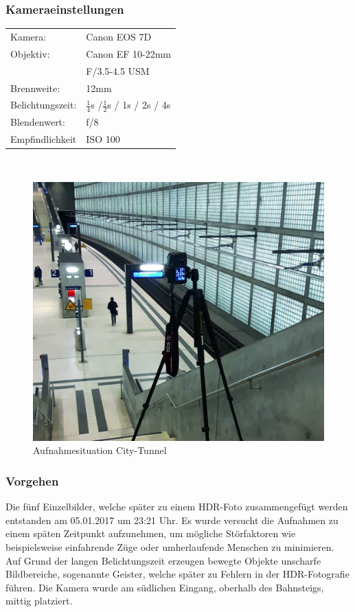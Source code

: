 \documentclass[liststotoc,bibtotoc,fontsize=14pt,]{scrreprt}
\begin{document}
	\subsubsection{Kameraeinstellungen}
	\begin{minipage}{0.58\textwidth}
		\begin{tabular}{ll}
			Kamera: &Canon EOS 7D \\
			Objektiv: &Canon EF 10-22mm \\
			& F/3.5-4.5 USM\\		
			Brennweite:& 12mm \\
			Belichtungszeit: & $\frac{1}{4}$s /$\frac{1}{2}$s / 1s / 2s / 4s\\
			Blendenwert: & f/8\\
			Empfindlichkeit & ISO 100 \\
		\end{tabular}\\
	\end{minipage}%
	\begin{minipage}{0.42\textwidth}
		\begin{figure}[H]
			\includegraphics[width=\linewidth]{img/places/leuscher.jpg}
			\caption{Aufnahmesituation City-Tunnel}
			\label{img:ak}
		\end{figure}
	\end{minipage}%
		

	
	\subsubsection{Vorgehen}
	Die fünf Einzelbilder, welche später zu einem HDR-Foto zusammengefügt werden entstanden am 05.01.2017 um 23:21 Uhr. Es wurde versucht die Aufnahmen zu einem späten Zeitpunkt aufzunehmen, um mögliche Störfaktoren wie beispielsweise einfahrende Züge oder umherlaufende Menschen zu minimieren. Auf Grund der langen Belichtungszeit erzeugen bewegte Objekte unscharfe Bildbereiche, sogenannte Geister, welche später zu Fehlern in der HDR-Fotografie führen. Die Kamera wurde am südlichen Eingang, oberhalb des Bahnsteigs, mittig platziert.
\end{document}
